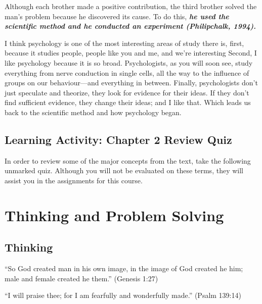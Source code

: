 \documentclass[
]{book}
\begin{document}
Although each brother made a positive contribution, the third brother solved the man's problem because he discovered its cause. To do this, \textbf{\emph{he used the scientific method and he conducted an experiment (Philipchalk, 1994).}}

I think psychology is one of the most interesting areas of study there is, first, because it studies people, people like you and me, and we're interesting Second, I like psychology because it is so broad. Psychologists, as you will soon see, study everything from nerve conduction in single cells, all the way to the influence of groups on our behaviour---and everything in between. Finally, psychologists don't just speculate and theorize, they look for evidence for their ideas. If they don't find sufficient evidence, they change their ideas; and I like that. Which leads us back to the scientific method and how psychology began.

\hypertarget{learning-activity-chapter-2-review-quiz}{%
\subsection*{Learning Activity: Chapter 2 Review Quiz}\label{learning-activity-chapter-2-review-quiz}}

\begin{reflect}
In order to review some of the major concepts from the text, take the following unmarked quiz. Although you will not be evaluated on these terms, they will assist you in the assignments for this course.
\end{reflect}

\hypertarget{thinking-and-problem-solving}{%
\section{Thinking and Problem Solving}\label{thinking-and-problem-solving}}

\hypertarget{thinking}{%
\subsection*{Thinking}\label{thinking}}

``So God created man in his own image, in the image of God created he him; male and female created he them.'' (Genesis 1:27)

``I will praise thee; for I am fearfully and wonderfully made.'' (Psalm 139:14)
\end{document}
